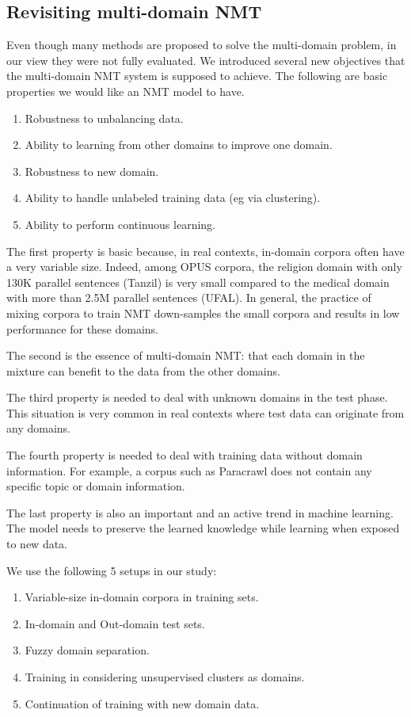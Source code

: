 \documentclass[12pt,a4paper,twoside]{report}
\theoremstyle{definition}
\begin{document}
\subsection*{Revisiting multi-domain NMT}
Even though many methods are proposed to solve the multi-domain problem, in our view they were not fully evaluated. We introduced several new objectives that the multi-domain NMT system is supposed to achieve. The following are basic properties we would like an NMT model to have.
\begin{enumerate}
	\item \label{ax:1} Robustness to unbalancing data.
	\item \label{ax:2} Ability to learning from other domains to improve one domain.
	\item \label{ax:3} Robustness to new domain.
	\item \label{ax:4} Ability to handle unlabeled training data (eg via clustering).
	\item \label{ax:5} Ability to perform continuous learning.
\end{enumerate}

The first property is basic because, in real contexts, in-domain corpora often have a very variable size. Indeed, among OPUS corpora, the religion domain with only 130K parallel sentences (Tanzil) is very small compared to the medical domain with more than 2.5M parallel sentences (UFAL). In general, the practice of mixing corpora to train NMT down-samples the small corpora and results in low performance for these domains. 

The second is the essence of multi-domain NMT: that each domain in the mixture can benefit to the data from the other domains. 

The third property is needed to deal with unknown domains in the test phase. This situation is very common in real contexts where test data can originate from any domains. 

The fourth property is needed to deal with training data without domain information. For example, a corpus such as Paracrawl does not contain any specific topic or domain information. 

The last property is also an important and an active trend in machine learning. The model needs to preserve the learned knowledge while learning when exposed to new data.

We use the following 5 setups in our study:
\begin{enumerate}
	\item \label{setup:1} Variable-size in-domain corpora in training sets.
	\item \label{setup:2} In-domain and Out-domain test sets.
	\item \label{setup:3} Fuzzy domain separation.
	\item \label{setup:4} Training in considering unsupervised clusters as domains.
	\item \label{setup:5} Continuation of training with new domain data.
\end{enumerate}
\end{document}
